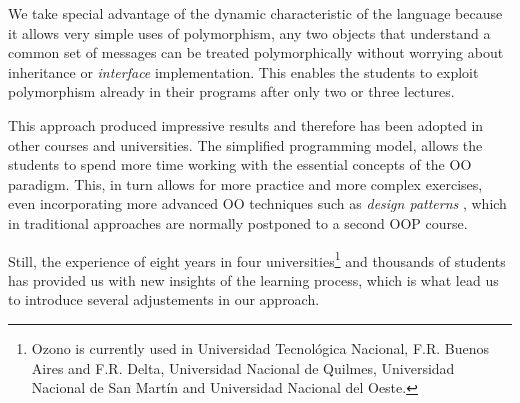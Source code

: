 We take special advantage of the dynamic characteristic of the language because it allows very simple uses of polymorphism, 
\ie any two objects that understand a common set of messages can be treated polymorphically without worrying about inheritance or \emph{interface} implementation.
This enables the students to exploit polymorphism already in their programs after only two or three lectures.

\medskip
This approach produced impressive results and therefore has been adopted in other courses and universities.
The simplified programming model, allows the students to spend more time working with the essential concepts of the OO paradigm.
This, in turn allows for more practice and more complex exercises, even incorporating more advanced OO techniques such as \emph{design patterns} \cite{Gamm03a},
which in traditional approaches are normally postponed to a second OOP course.





Still, the experience of eight years in four universities\footnote{Ozono is currently used in Universidad Tecnológica Nacional, F.R. Buenos Aires and F.R. Delta, 
Universidad Nacional de Quilmes, Universidad Nacional de San Martín and Universidad Nacional del Oeste.}
and thousands of students has provided us with new insights of the learning process, 
which is what lead us to introduce several adjustements in our approach.

